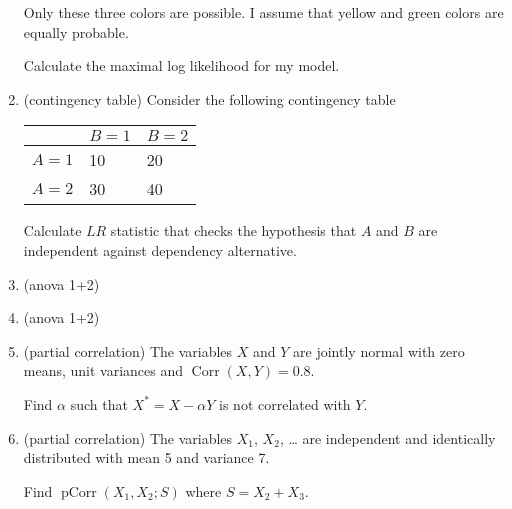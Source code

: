 \documentclass[12pt]{article}
\DeclareMathOperator{\Corr}{Corr}
\DeclareMathOperator{\pCorr}{pCorr}
\begin{document}
\begin{enumerate}
    Only these three colors are possible. I assume that yellow and green colors are equally probable.  
    
    Calculate the maximal log likelihood for my model.  
    \item (contingency table) Consider the following contingency table 
    
    \begin{tabular}{@{}lll@{}}
        \toprule
         & $B=1$ & $B=2$ \\ 
         \midrule
         $A=1$ & 10 & 20 \\
         $A=2$ & 30 & 40 \\
        \bottomrule
        \end{tabular}


    Calculate $LR$ statistic that checks the hypothesis that $A$ and $B$ are independent against dependency alternative. 

    \item (anova 1+2)
    \item (anova 1+2)

    \item (partial correlation) The variables $X$ and $Y$ are jointly normal with zero means,
unit variances and $\Corr(X, Y) = 0.8$. 

Find $\alpha$ such that $X^* = X - \alpha Y$ is not correlated with $Y$. 

\item (partial correlation) The variables $X_1$, $X_2$, \ldots{ } are independent and identically distributed with mean 5 and variance 7. 

Find $\pCorr(X_1, X_2; S)$ where $S = X_2 + X_3$.
    
    
\end{enumerate}
\end{document}
